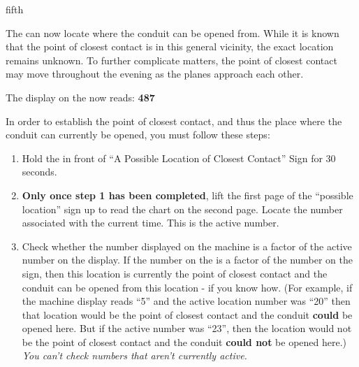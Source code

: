 \documentclass[notebook]{elementals}
\begin{document}
\begin{page}{fifth}

The \iTricorder{} can now locate where the conduit can be opened from. While it is known that the point of closest contact is in this general vicinity, the exact location remains unknown. To further complicate matters, the point of closest contact may move throughout the evening as the planes approach each other.

The display on the \iTricorder{} now reads: {\bf {\large 487}}

In order to establish the point of closest contact, and thus the place where the conduit can currently be opened, you must follow these steps:
\begin{enumerate}
  \item Hold the \iTricorder{} in front of ``A Possible Location of Closest Contact'' Sign for 30 seconds.
  \item {\bf Only once step 1 has been completed}, lift the first page of the ``possible location'' sign up to read the chart on the second page. Locate the number associated with the current time. This is the active number.
  \item Check whether the number displayed on the machine is a factor of the active number on the \iTricorder{} display. If the number on the \iTricorder{} is a factor of the number on the sign, then this location is currently the point of closest contact and the conduit can be opened from this location - if you know how. (For example, if the machine display reads ``5'' and the active location number was ``20'' then that location would be the point of closest contact and the conduit {\bf could} be opened here. But if the active number was ``23'', then the location would not be the point of closest contact and the conduit {\bf could not} be opened here.) \emph{You can't check numbers that aren't currently active.} 
\end{enumerate}
\end{page}

\endnotebook
\end{document}
